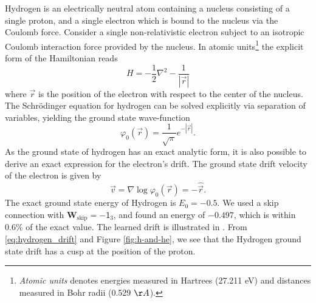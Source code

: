 \documentclass[12pt]{msml2020} %
\newcommand*{\bv}{\vec{v}}
\newcommand*{\br}{\vec{r}}
\begin{document}
Hydrogen is an electrically neutral atom containing a nucleus consisting of a single proton, and a single electron which is bound to the nucleus via the Coulomb force. Consider a single non-relativistic electron subject to an isotropic Coulomb interaction force provided by the nucleus. In atomic units\footnote{\emph{Atomic units} denotes energies measured in Hartrees (27.211 eV) and distances measured in Bohr radii (0.529 $\AA$).} the explicit form of the Hamiltonian reads
%
\begin{equation}\label{eq:hydrogen_Hamiltonian}
H = -\frac{1}{2}\nabla^{2} - \frac{1}{|\br|}
\end{equation}
%
where $\br$ is the position of the electron with respect to the center of the nucleus. The Schr\"odinger equation for hydrogen can be solved explicitly via separation of variables, yielding the ground state wave-function
%
\begin{equation}\label{eq:hydrogen_wave} 
\varphi_{0}(\br) = \frac{1}{\sqrt{\pi}}e^{-|\br|}.
\end{equation}
%
As the ground state of hydrogen has an exact analytic form, it is also possible to derive an exact expression for the electron's drift. The ground state drift velocity of the electron is given by
%
\begin{equation}\label{eq:hydrogen_drift}
\bv = \nabla\log \varphi_0(\br) = -\hat{\br}.
\end{equation} 
%
The exact ground state energy of Hydrogen is $E_{0}= -0.5$. We used a skip connection with $\mathbf{W}_\text{skip}=-\mathsf{1}_3$, and found an energy of $-0.497$, which is within $0.6 \%$  of the exact value. The learned drift is illustrated in . From \eqref{eq:hydrogen_drift} and Figure \ref{fig:h-and-he}, we see that the Hydrogen ground state drift has a cusp at the position of the proton.
\end{document}
